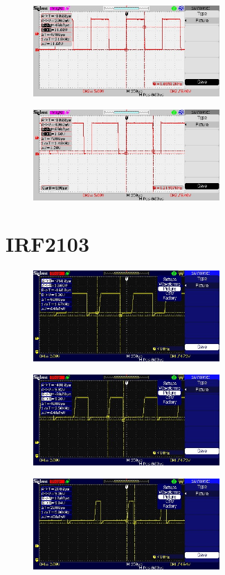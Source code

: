 \documentclass[a4paper, 11pt, oneside]{uet_thesis}  %
\begin{document}
\begin{figure}[htbp]
	\centering
	\includegraphics[width = 2.8in]{./Figures/tlp/4}
\end{figure}	

\begin{figure}[htbp]
	\centering
	\includegraphics[width = 2.8in]{./Figures/tlp/5}
\end{figure}	

\newpage
\section{IRF2103}

\begin{figure}[htbp]
	\centering
	\includegraphics[width = 2.8in]{./Figures/irf/1}
\end{figure}	

\begin{figure}[htbp]
	\centering
	\includegraphics[width = 2.8in]{./Figures/irf/2}
\end{figure}	

\begin{figure}[htbp]
	\centering
	\includegraphics[width = 2.8in]{./Figures/irf/3}
\end{figure}	
\end{document}
